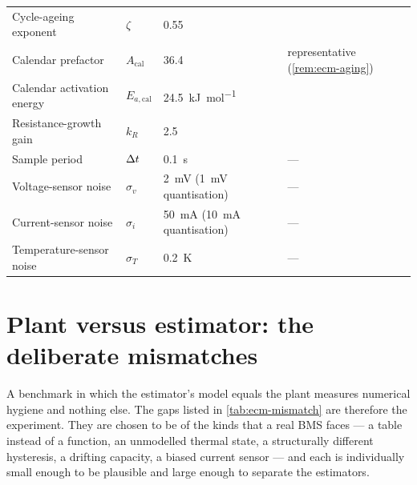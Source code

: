 \begin{table}[H]
\begin{tabular}{llll}
Cycle-ageing exponent & $\zeta$ & \num{0.55} & \cite{wang2011cyclelife}\\
Calendar prefactor & $A_{\mathrm{cal}}$ & \num{36.4} & representative (\cref{rem:ecm-aging})\\
Calendar activation energy & $E_{a,\mathrm{cal}}$ & \SI{24.5}{\kilo\joule\per\mole} & \cite{schmalstieg2014aging}\\
Resistance-growth gain & $k_R$ & \num{2.5} & \cite{schmalstieg2014aging}\\[1mm]
Sample period & $\Delta t$ & \SI{0.1}{\second} & ---\\
Voltage-sensor noise & $\sigma_v$ & \SI{2}{\milli\volt} (\SI{1}{\milli\volt} quantisation) & ---\\
Current-sensor noise & $\sigma_i$ & \SI{50}{\milli\ampere} (\SI{10}{\milli\ampere} quantisation) & ---\\
Temperature-sensor noise & $\sigma_T$ & \SI{0.2}{\kelvin} & ---\\
\bottomrule\end{tabular}
\end{table}

\section{Plant versus estimator: the deliberate mismatches}
\label{sec:ecm-mismatch}

A benchmark in which the estimator's model equals the plant measures numerical hygiene and
nothing else. The gaps listed in \cref{tab:ecm-mismatch} are therefore the experiment. They are
chosen to be of the kinds that a real BMS faces --- a table instead of a function, an unmodelled
thermal state, a structurally different hysteresis, a drifting capacity, a biased current sensor
--- and each is individually small enough to be plausible and large enough to separate the
estimators.

